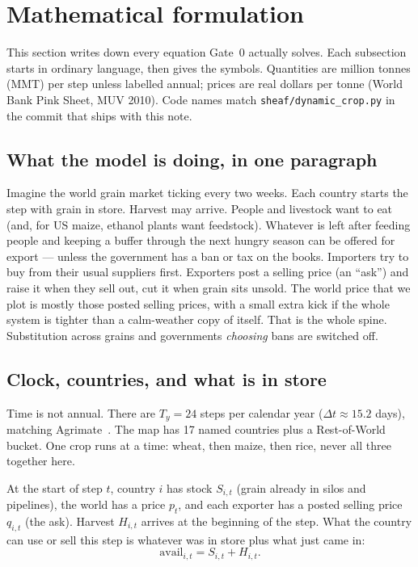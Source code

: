 \section{Mathematical formulation}
\label{sec:math}

This section writes down every equation Gate~0 actually solves. Each
subsection starts in ordinary language, then gives the symbols. Quantities
are million tonnes (MMT) per step unless labelled annual; prices are real
dollars per tonne (World Bank Pink Sheet, MUV 2010). Code names match
\texttt{sheaf/dynamic\_crop.py} in the commit that ships with this note.

\subsection{What the model is doing, in one paragraph}

Imagine the world grain market ticking every two weeks. Each country starts
the step with grain in store. Harvest may arrive. People and livestock want
to eat (and, for US maize, ethanol plants want feedstock). Whatever is left
after feeding people and keeping a buffer through the next hungry season can
be offered for export --- unless the government has a ban or tax on the
books. Importers try to buy from their usual suppliers first. Exporters post
a selling price (an ``ask'') and raise it when they sell out, cut it when
grain sits unsold. The world price that we plot is mostly those posted
selling prices, with a small extra kick if the whole system is tighter than
a calm-weather copy of itself. That is the whole spine. Substitution across
grains and governments \emph{choosing} bans are switched off.

\subsection{Clock, countries, and what is in store}
\label{sec:clock}

Time is not annual. There are $T_y=24$ steps per calendar year
($\Delta t\approx 15.2$ days), matching Agrimate~\citep{kuhla2025}. The map
has 17 named countries plus a Rest-of-World bucket. One crop runs at a time:
wheat, then maize, then rice, never all three together here.

At the start of step $t$, country $i$ has stock $S_{i,t}$ (grain already in
silos and pipelines), the world has a price $p_t$, and each exporter has a
posted selling price $q_{i,t}$ (the ask). Harvest $H_{i,t}$ arrives at the
beginning of the step. What the country can use or sell this step is
whatever was in store plus what just came in:
\[
\mathrm{avail}_{i,t}=S_{i,t}+H_{i,t}.
\]

